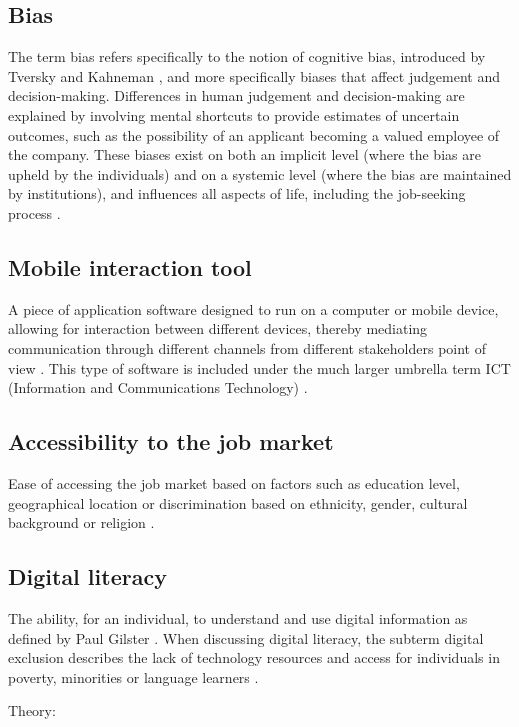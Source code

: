 \subsection{Bias}
The term bias refers specifically to the notion of cognitive bias, introduced by Tversky and Kahneman \cite{Kahneman2002}, and more specifically biases that affect judgement and decision-making. Differences in human judgement and decision-making are explained by involving mental shortcuts to provide estimates of uncertain outcomes, such as the possibility of an applicant becoming a valued employee of the company. These biases exist on both an implicit level (where the bias are upheld by the individuals) and on a systemic level (where the bias are maintained by institutions), and influences all aspects of life, including the job-seeking process \cite{MediumArticle}.

\subsection{Mobile interaction tool}
A piece of application software designed to run on a computer or mobile device, allowing for interaction between different devices, thereby mediating communication through different channels from different stakeholders point of view \cite{Application}. This type of software is included under the much larger umbrella term ICT (Information and Communications Technology) \cite{ICT}.

\subsection{Accessibility to the job market}
Ease of accessing the job market based on factors such as education level, geographical location or discrimination based on ethnicity, gender, cultural background or religion \cite{Paulsen2017}.

\subsection{Digital literacy}
The ability, for an individual, to understand and use digital information as defined by Paul Gilster \cite{gilster1997digital}. When discussing digital literacy, the subterm digital exclusion describes the lack of technology resources and access for individuals in poverty, minorities or language learners \cite{Exclusion}. 

Theory:

